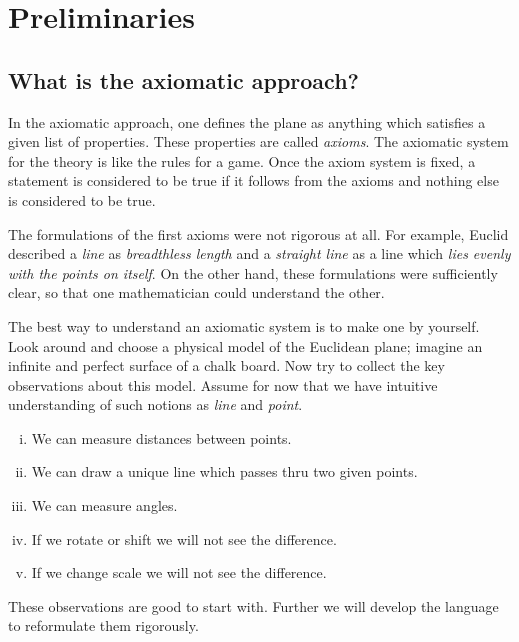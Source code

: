 \chapter{Preliminaries}\label{chap:metr}

\section*{What is the axiomatic approach?}

In the axiomatic approach,
one defines the plane as anything which satisfies 
a given list of properties.
These properties are called {}\emph{axioms}.
The axiomatic system for the theory 
is like the rules for a game.
Once the axiom system is fixed, a statement is considered to be true if it follows from the axioms and nothing else is considered to be true.

The formulations of the first axioms were not rigorous at all.
For example, Euclid described a {}\emph{line} as {}\emph{breadthless length}
and a {}\emph{straight line} as a line which {}\emph{lies evenly with the points on itself}.
On the other hand,
these formulations were sufficiently clear, 
so that one mathematician could understand the other.

The best way to understand an axiomatic system
is to make one by yourself.
Look around and choose a physical model 
of the Euclidean plane;
imagine an infinite and perfect surface of a chalk board. 
Now try to collect the key observations
about this model.
Assume for now that we have intuitive understanding of such notions as {}\emph{line} and {}\emph{point}.
\begin{enumerate}[(i)]
 \item\label{preaxiomI} We can measure distances between points.
 \item\label{preaxiomII} We can draw a unique line 
 which passes thru two given points.
 \item\label{preaxiomIII} We can measure angles.
 \item\label{preaxiomIV} If we rotate or shift we will not see the difference.
 \item\label{preaxiomV} If we change scale we will not see the difference.
\end{enumerate}
These observations are good to start with.
Further we will develop the language
to reformulate them rigorously.

